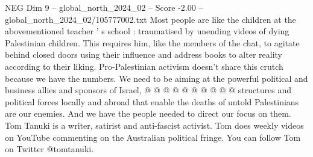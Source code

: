 \begin{textsample}{NEG Dim 9 – global\_north\_2024\_02 – Score -2.00 – global\_north\_2024\_02/105777002.txt}
Most people are like the children at the abovementioned teacher ' s school : traumatised by unending videos of dying Palestinian children.
This requires him, like the members of the chat, to agitate behind closed doors using their influence and address books to alter reality according to their liking.
Pro-Palestinian activism doesn't share this crutch because we have the numbers.
We need to be aiming at the powerful political and business allies and sponsors of Israel, @ @ @ @ @ @ @ @ @ @ structures and political forces locally and abroad that enable the deaths of untold Palestinians are our enemies.
And we have the people needed to direct our focus on them.
Tom Tanuki is a writer, satirist and anti-fascist activist.
Tom does weekly videos on YouTube commenting on the Australian political fringe.
You can follow Tom on Twitter @tomtanuki.

\end{textsample}
